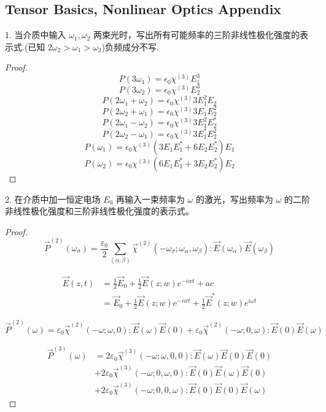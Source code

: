 \subsection{Tensor Basics, Nonlinear Optics Appendix}

\begin{exercise}

1.   当介质中输入 $\omega_1, \omega_2$ 两束光时，写出所有可能频率的三阶非线性极化强度的表示式.(已知 $2\omega_2>\omega_1>\omega_2$)负频成分不写.

\end{exercise}

\begin{proof}
$$P(3\omega_1)=\epsilon_0 \chi^{(3)}E_1^3$$
$$P(3\omega_2)=\epsilon_0 \chi^{(3)}E_2^3$$
$$P(2\omega_1+\omega_2)=
\epsilon_0 \chi^{(3)} 3E_1^2E_2$$
$$P(2\omega_2+\omega_1)=
\epsilon_0 \chi^{(3)} 3E_1E_2^2$$
$$P(2\omega_1-\omega_2)=
\epsilon_0 \chi^{(3)} 3E_1^2E_2^*$$
$$P(2\omega_2-\omega_1)=
\epsilon_0 \chi^{(3)} 3E_1^*E_2^2$$
$$P(\omega_1)=\epsilon_0 \chi^{(3)}(3E_1E_1^{*}+6E_2 E_2^*)E_1$$
$$P(\omega_2)=\epsilon_0 \chi^{(3)}(6E_1E_1^{*}+3E_2 E_2^*)E_2$$
\end{proof}

\begin{exercise}
2. 在介质中加一恒定电场 $E_0$ 再输入一束频率为 $\omega$ 的激光，写出频率为 $\omega$ 的二阶非线性极化强度和三阶非线性极化强度的表示式。
\end{exercise}


\begin{proof}
$$
\vec{P}^{(2)}\left(\omega_{\sigma}\right)=\frac{\varepsilon_{0}}{2} \sum_{(\alpha, \beta)} \vec{\chi}^{(2)}\left(-\omega_{\sigma} ; \omega_{\alpha}, \omega_{\beta}\right): \vec{E}\left(\omega_{\alpha}\right) \vec{E}\left(\omega_{\beta}\right)
$$

$$
\begin{aligned} \vec{E}(z, t) &=\frac{1}{2} \vec{E}_{0}+\frac{1}{2} \vec{E}(z ; w) e^{-i w t}+a c \\ &=\vec{E}_{0}+\frac{1}{2} \vec{E}(z ; w) e^{-i w t}+\frac{1}{2} \vec{E}^{*}(z ; w) e^{i \omega t} \end{aligned}
$$


$$
\vec{P}^{(2)}\left(\omega\right)=\varepsilon_{0} \vec{\chi}^{(2)}\left(-\omega ; \omega, 0 \right): \vec{E}\left(\omega\right) \vec{E}\left(0\right) + \varepsilon_{0} \vec{\chi}^{(2)}\left(-\omega ; 0, \omega \right): \vec{E}\left(0\right) \vec{E}\left(\omega\right)
$$

$$
\begin{aligned}
\vec{P}^{(3)}\left(\omega\right)&= 2\varepsilon_{0} \vec{\chi}^{(3)}\left(-\omega ; \omega, 0 ,0 \right): \vec{E}\left(\omega\right) \vec{E}\left(0\right)  \vec{E}\left(0\right)\\ & +2\varepsilon_{0} \vec{\chi}^{(3)}\left(-\omega ; 0, \omega, 0 \right): \vec{E}\left(0\right) \vec{E}\left(\omega\right)  \vec{E}\left(0\right)\\ &+2\varepsilon_{0} \vec{\chi}^{(3)}\left(-\omega ; 0,0,\omega \right): \vec{E}\left(0\right) \vec{E}\left(0\right)  \vec{E}\left(\omega\right)
\end{aligned}
$$
\end{proof}


